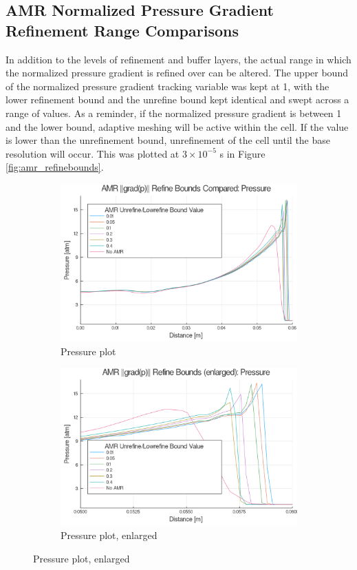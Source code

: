 \subsection{AMR Normalized Pressure Gradient Refinement Range Comparisons}
In addition to the levels of refinement and buffer layers, the actual range in which the normalized pressure gradient is refined over can be altered. The upper bound of the normalized pressure gradient tracking variable was kept at 1, with the lower refinement bound and the unrefine bound kept identical and swept across a range of values. As a reminder, if the normalized pressure gradient is between 1 and the lower bound, adaptive meshing will be active within the cell. If the value is lower than the unrefinement bound, unrefinement of the cell until the base resolution will occur. This was plotted at \(3\times 10^{ - 5}\) s in Figure \ref{fig:amr_refinebounds}. 
\begin{figure}[]
    \centering
    \begin{subfigure}[]{\textwidth}
        \centering
        \includegraphics[width=\textwidth]{./figs/amrfigs/amr_refinebounds/p.png}
        \caption{Pressure plot}
    \end{subfigure}

    \centering
    \begin{subfigure}[]{\textwidth}
        \centering
        \includegraphics[width=\textwidth]{./figs/amrfigs/amr_refinebounds/pe.png}
        \caption{Pressure plot, enlarged}
    \end{subfigure}

\end{figure}
